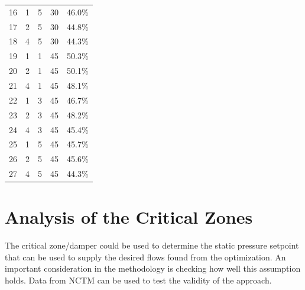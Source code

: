 \begin{table}
\begin{tabular}{@{}lllcl@{}}
16  & 1  & 5           & 30                & 46.0\%          \\
17  & 2  & 5           & 30                & 44.8\%          \\
18  & 4  & 5           & 30                & 44.3\%          \\
19  & 1  & 1           & 45                & 50.3\%          \\
20  & 2  & 1           & 45                & 50.1\%          \\
21  & 4  & 1           & 45                & 48.1\%          \\
22  & 1  & 3           & 45                & 46.7\%          \\
23  & 2  & 3           & 45                & 48.2\%          \\
24  & 4  & 3           & 45                & 45.4\%          \\
25  & 1  & 5           & 45                & 45.7\%          \\
26  & 2  & 5           & 45                & 45.6\%          \\
27  & 4  & 5           & 45                & 44.3\%          \\ \bottomrule
\end{tabular}
\end{table}




% 




\section{Analysis of the Critical Zones}

The critical zone/damper could be used to determine the static pressure
setpoint that can be used to supply the desired flows found from the
optimization. An important consideration in the methodology is checking
how well this assumption holds. Data from NCTM can be used to test the
validity of the approach.

